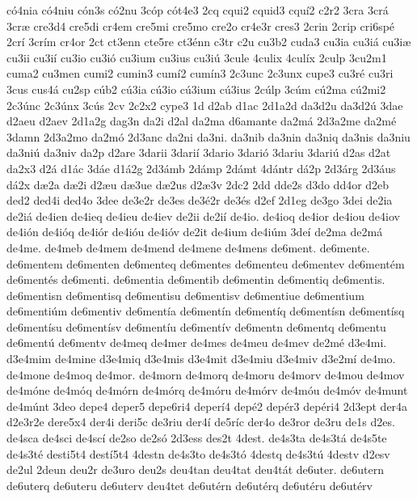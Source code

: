 {c^^f34nia
c^^f34niu
c^^f3n3s
c^^f32nu
3c^^f3p
c^^f3t4e3
2cq
cqui2
cquid3
cqu^^ed2
c2r2
3cra
3cr^^e1
3cr^^e6
cre3d4
cre5di
cr4em
cre5mi
cre5mo
cre2o
cr4e3r
cres3
2crin
2crip
cri6sp^^e9
2cr^^ed
3cr^^edm
cr4or
2ct
ct3enn
cte5re
ct3^^e9nn
c3tr
c2u
cu3b2
cuda3
cu3ia
cu3i^^e1
cu3i^^e6
cu3ii
cu3i^^ed
cu3io
cu3i^^f3
cu3ium
cu3ius
cu3i^^fa
3cule
4culix
4cul^^edx
2culp
3cu2m1
cuma2
cu3men
cumi2
cumin3
cum^^ed2
cum^^edn3
2c3unc
2c3unx
cupe3
cu3r^^e9
cu3ri
3cus
cus4^^e1
cu2sp
c^^fab2
c^^fa3ia
c^^fa3io
c^^fa3ium
c^^fa3ius
2c^^falp
3c^^fam
c^^fa2ma
c^^fa2mi2
2c3^^fanc
2c3^^fanx
3c^^fas
2cv
2c2x2
cype3
1d
d2ab
d1ac
2d1a2d
da3d2u
da3d2^^fa
3dae
d2aeu
d2aev
2d1a2g
dag3n
da2i
d2al
da2ma
d6amante
da2m^^e1
2d3a2me
da2m^^e9
3damn
2d3a2mo
da2m^^f3
2d3anc
da2ni
da3ni.
da3nib
da3nin
da3niq
da3nis
da3niu
da3ni^^fa
da3niv
da2p
d2are
3darii
3dari^^ed
3dario
3dari^^f3
3dariu
3dari^^fa
d2as
d2at
da2x3
d2^^e1
d1^^e1c
3d^^e1e
d1^^e12g
2d3^^e1mb
2d^^e1mp
2d^^e1mt
4d^^e1ntr
d^^e12p
2d3^^e1rg
2d3^^e1us
d^^e12x
d^^e62a
d^^e62i
d2^^e6u
d^^e63ue
d^^e62us
d2^^e63v
2dc2
2dd
dde2s
d3do
dd4or
d2eb
ded2
ded4i
ded4o
3dee
de3e2r
de3es
de3^^e92r
de3^^e9s
d2ef
2d1eg
de3go
3dei
de2ia
de2i^^e1
de4ien
de4ieq
de4ieu
de4iev
de2ii
de2i^^ed
de4io.
de4ioq
de4ior
de4iou
de4iov
de4i^^f3n
de4i^^f3q
de4i^^f3r
de4i^^f3u
de4i^^f3v
de2it
de4ium
de4i^^fam
3de^^ed
de2ma
de2m^^e1
de4me.
de4meb
de4mem
de4mend
de4mene
de4mens
de6ment.
de6mente.
de6mentem
de6menten
de6menteq
de6mentes
de6menteu
de6mentev
de6ment^^e9m
de6ment^^e9s
de6menti.
de6mentia
de6mentib
de6mentin
de6mentiq
de6mentis.
de6mentisn
de6mentisq
de6mentisu
de6mentisv
de6mentiue
de6mentium
de6menti^^fam
de6mentiv
de6ment^^eda
de6ment^^edn
de6ment^^edq
de6ment^^edsn
de6ment^^edsq
de6ment^^edsu
de6ment^^edsv
de6ment^^edu
de6ment^^edv
de6mentn
de6mentq
de6mentu
de6ment^^fa
de6mentv
de4meq
de4mer
de4mes
de4meu
de4mev
de2m^^e9
d3e4mi.
d3e4mim
de4mine
d3e4miq
d3e4mis
d3e4mit
d3e4miu
d3e4miv
d3e2m^^ed
de4mo.
de4mone
de4moq
de4mor.
de4morn
de4morq
de4moru
de4morv
de4mou
de4mov
de4m^^f3ne
de4m^^f3q
de4m^^f3rn
de4m^^f3rq
de4m^^f3ru
de4m^^f3rv
de4m^^f3u
de4m^^f3v
de4munt
de4m^^fant
3deo
depe4
deper5
depe6ri4
deper^^ed4
dep^^e92
dep^^e9r3
dep^^e9ri4
2d3ept
der4a
d2e3r2e
dere5x4
der4i
deri5c
de3riu
der4^^ed
de5r^^edc
der4o
de3ror
de3ru
de1s
d2es.
de4sca
de4sci
de4sc^^ed
de2so
de2s^^f3
2d3ess
des2t
4dest.
de4s3ta
de4s3t^^e1
de4s5te
de4s3t^^e9
desti5t4
dest^^ed5t4
4destn
de4s3to
de4s3t^^f3
4destq
de4s3t^^fa
4destv
d2esv
de2ul
2deun
deu2r
de3uro
deu2s
deu4tan
deu4tat
deu4t^^e1t
de6uter.
de6utern
de6uterq
de6uteru
de6uterv
deu4tet
de6ut^^e9rn
de6ut^^e9rq
de6ut^^e9ru
de6ut^^e9rv
}
